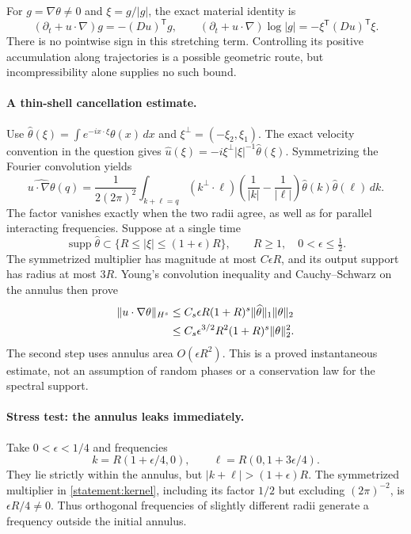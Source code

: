 \documentclass[11pt,a4paper]{article}
\numberwithin{equation}{section}
\begin{document}
For $g=\nabla\theta\ne0$ and $\xi=g/|g|$, the exact material identity is
\[
 (\partial_t+u\cdot\nabla)g=-(Du)^{\mathsf T}g,\qquad
 (\partial_t+u\cdot\nabla)\log|g|
       =-\xi^{\mathsf T}(Du)^{\mathsf T}\xi.
\]
There is no pointwise sign in this stretching term. Controlling its
positive accumulation along trajectories is a possible geometric route,
but incompressibility alone supplies no such bound.

\paragraph{A thin-shell cancellation estimate.}
Use $\widehat\theta(\xi)=\int e^{-ix\cdot\xi}\theta(x)\,dx$ and
$\xi^\perp=(-\xi_2,\xi_1)$. The exact velocity convention in the question
gives $\widehat u(\xi)=-i\xi^\perp|\xi|^{-1}\widehat\theta(\xi)$.
Symmetrizing the Fourier convolution yields
\begin{equation}\label{statement:kernel}
 \widehat{u\cdot\nabla\theta}(q)
 =\frac{1}{2(2\pi)^2}\int_{k+\ell=q}
 (k^\perp\cdot\ell)
 \left(\frac1{|k|}-\frac1{|\ell|}\right)
 \widehat\theta(k)\widehat\theta(\ell)\,dk.
\end{equation}
The factor vanishes exactly when the two radii agree, as well as for
parallel interacting frequencies. Suppose at a single time
\[
 \operatorname{supp}\widehat\theta\subset
 \{R\le|\xi|\le(1+\epsilon)R\},
 \qquad R\ge1,\quad0<\epsilon\le\tfrac12.
\]
The symmetrized multiplier has magnitude at most $C\epsilon R$, and its
output support has radius at most $3R$. Young's convolution inequality and
Cauchy--Schwarz on the annulus then prove
\begin{align}
 \|u\cdot\nabla\theta\|_{H^s}
 &\le C_s\epsilon R(1+R)^s
                   \|\widehat\theta\|_1\|\theta\|_2\notag\\
 &\le C_s\epsilon^{3/2}R^2(1+R)^s\|\theta\|_2^2.
 \label{statement:shell}
\end{align}
The second step uses annulus area $O(\epsilon R^2)$. This is a proved
instantaneous estimate, not an assumption of random phases or a
conservation law for the spectral support.

\paragraph{Stress test: the annulus leaks immediately.}
Take $0<\epsilon<1/4$ and frequencies
\[
 k=R(1+\epsilon/4,0),\qquad
 \ell=R(0,1+3\epsilon/4).
\]
They lie strictly within the annulus, but $|k+\ell|>(1+\epsilon)R$.
The symmetrized multiplier in \eqref{statement:kernel}, including its factor
$1/2$ but excluding $(2\pi)^{-2}$, is $\epsilon R/4\ne0$.
Thus orthogonal frequencies of slightly different radii generate a frequency
outside the initial annulus.
\end{document}
